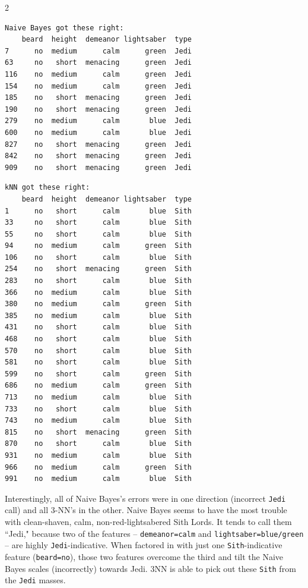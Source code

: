 \documentclass[12pt]{article}
\begin{document}
\scriptsize
\begin{multicols}{2}
\begin{Verbatim}[fontsize=\small,samepage=true,frame=none]
Naive Bayes got these right:
    beard  height  demeanor lightsaber  type
7      no  medium      calm      green  Jedi
63     no   short  menacing      green  Jedi
116    no  medium      calm      green  Jedi
154    no  medium      calm      green  Jedi
185    no   short  menacing      green  Jedi
190    no   short  menacing      green  Jedi
279    no  medium      calm       blue  Jedi
600    no  medium      calm       blue  Jedi
827    no   short  menacing      green  Jedi
842    no   short  menacing      green  Jedi
909    no   short  menacing      green  Jedi
\end{Verbatim}
\columnbreak
\begin{Verbatim}[fontsize=\small,samepage=true,frame=none]
kNN got these right:
    beard  height  demeanor lightsaber  type
1      no   short      calm       blue  Sith
33     no   short      calm       blue  Sith
55     no   short      calm       blue  Sith
94     no  medium      calm      green  Sith
106    no   short      calm       blue  Sith
254    no   short  menacing      green  Sith
283    no   short      calm       blue  Sith
366    no  medium      calm       blue  Sith
380    no  medium      calm      green  Sith
385    no  medium      calm       blue  Sith
431    no   short      calm       blue  Sith
468    no   short      calm       blue  Sith
570    no   short      calm       blue  Sith
581    no   short      calm       blue  Sith
599    no   short      calm      green  Sith
686    no  medium      calm      green  Sith
713    no  medium      calm       blue  Sith
733    no   short      calm       blue  Sith
743    no  medium      calm       blue  Sith
815    no   short  menacing      green  Sith
870    no   short      calm       blue  Sith
931    no  medium      calm       blue  Sith
966    no  medium      calm      green  Sith
991    no  medium      calm       blue  Sith
\end{Verbatim}
\end{multicols}
\normalsize

Interestingly, all of Naive Bayes's errors were in one direction (incorrect
\texttt{Jedi} call) and all 3-NN's in the other. Naive Bayes seems to have the
most trouble with clean-shaven, calm, non-red-lightsabered Sith Lords. It
tends to call them ``Jedi," because two of the features --
\texttt{demeanor=calm} and \texttt{lightsaber=blue/green} -- are highly
\texttt{Jedi}-indicative. When factored in with just one
\texttt{Sith}-indicative feature (\texttt{beard=no}), those two features
overcome the third and tilt the Naive Bayes scales (incorrectly) towards Jedi.
3NN is able to pick out these \texttt{Sith} from the \texttt{Jedi} masses.
\end{document}
